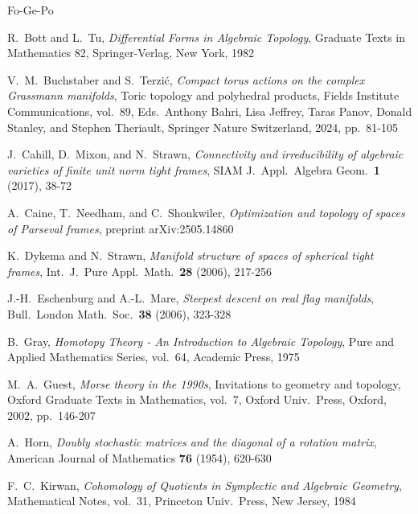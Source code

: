 \documentclass[12pt]{amsart}
\theoremstyle{definition}
\theoremstyle{remark}
\begin{document}
\begin{thebibliography}{Fo-Ge-Po}



 R.~Bott and L.~Tu, {\it Differential Forms in Algebraic Topology}, Graduate Texts in Mathematics 82,
Springer-Verlag, New York, 1982

 V.~M.~Buchstaber and S.~Terzi\'{c}, {\it Compact torus actions on the complex Grassmann manifolds}, Toric topology and polyhedral products, Fields Institute Communications, vol.~89, Eds.~Anthony Bahri, Lisa Jeffrey, Taras Panov, Donald Stanley, and Stephen Theriault, Springer Nature Switzerland, 2024, pp.~81-105

 J.~Cahill, D.~Mixon, and N.~Strawn, {\it Connectivity and irreducibility of algebraic varieties of finite unit norm tight frames}, SIAM J.~Appl.~Algebra Geom.~{\bf 1} (2017), 38-72

 A.~Caine, T.~Needham, and C.~Shonkwiler, {\it Optimization and topology of spaces of Parseval frames}, preprint arXiv:2505.14860



 K.~Dykema and N.~Strawn, {\it Manifold structure of spaces of spherical tight frames}, Int.~J.~Pure Appl.~Math.~{\bf 28} (2006), 
 217-256

 J.-H.~Eschenburg and A.-L.~Mare, {\it Steepest descent on real flag manifolds}, Bull.~London Math.~Soc.~{\bf 38}  (2006), 323-328

 B.~Gray, {\it Homotopy Theory - An Introduction to Algebraic Topology}, Pure and Applied Mathematics Series, vol.~64, Academic Press, 1975

 M.~A.~Guest, {\em Morse theory in the 1990s}, Invitations to geometry and topology, Oxford Graduate Texts in Mathematics, vol.~7, Oxford Univ.~Press, Oxford, 2002, pp.~146-207 

 A.~Horn, {\it Doubly stochastic matrices and the diagonal of a rotation matrix}, American Journal of Mathematics {\bf 76} (1954), 620-630

 F.~C.~Kirwan, {\it Cohomology of Quotients in Symplectic and Algebraic Geometry}, Mathematical
Notes, vol.~31, Princeton Univ.~Press, New Jersey, 1984


\end{thebibliography}
\end{document}
